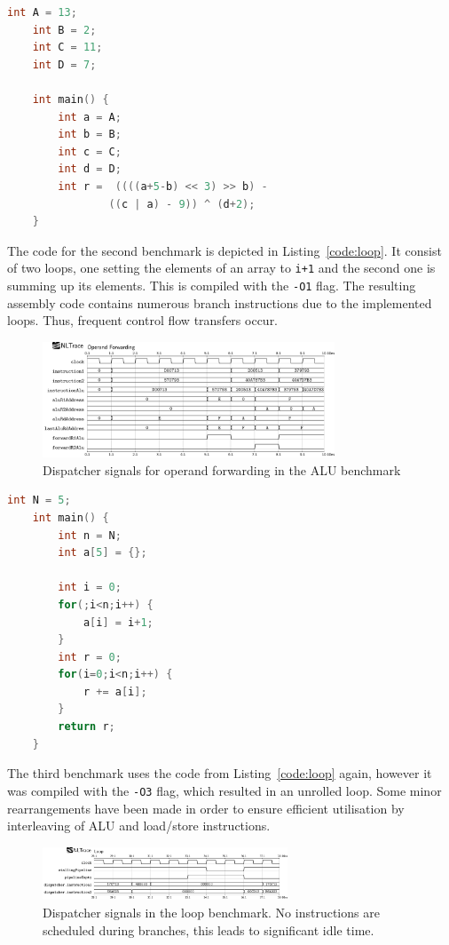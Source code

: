 \documentclass[conference]{IEEEtran}
\begin{document}
\begin{lstlisting}[language=C, caption=Code for the ALU benchmark, label=code:alu]
	int A = 13;
	int B = 2;
	int C = 11;
	int D = 7;

	int main() {
		int a = A;
		int b = B;
		int c = C;
		int d = D;
		int r =  ((((a+5-b) << 3) >> b) -
				((c | a) - 9)) ^ (d+2);
	}
\end{lstlisting}

The code for the second benchmark is depicted in Listing~\ref{code:loop}. It consist of two loops, one setting the elements of an array to \verb|i+1| and the second one is summing up its elements. This is compiled with the \verb|-O1| flag. The resulting assembly code contains numerous branch instructions due to the implemented loops. Thus, frequent control flow transfers occur.

\begin{figure}
	\centering
	\includegraphics[width=8.7cm]{vcd_forwarding.png}
	\caption{Dispatcher signals for operand forwarding in the ALU benchmark}
	\label{fig:vcd_alu}
\end{figure}


\begin{lstlisting}[language=C, caption=Code for the loop benchmark, label=code:loop]
	int N = 5;
	int main() {
		int n = N;
		int a[5] = {};

		int i = 0;
		for(;i<n;i++) {
			a[i] = i+1;
		}
		int r = 0;
		for(i=0;i<n;i++) {
			r += a[i];
		}
		return r;
	}
\end{lstlisting}

The third benchmark uses the code from Listing~\ref{code:loop} again, however it was compiled with the \verb|-O3| flag, which resulted in an unrolled loop. Some minor rearrangements have been made in order to ensure efficient utilisation by interleaving of ALU and load/store instructions.

\begin{figure}
	\centering
	\includegraphics[width=0.65\textwidth]{vcd_loop.png}
	\caption{Dispatcher signals in the loop benchmark. No instructions are scheduled during branches, this leads to significant idle time.}
	\label{fig:vcd_loop}
\end{figure}
\end{document}

